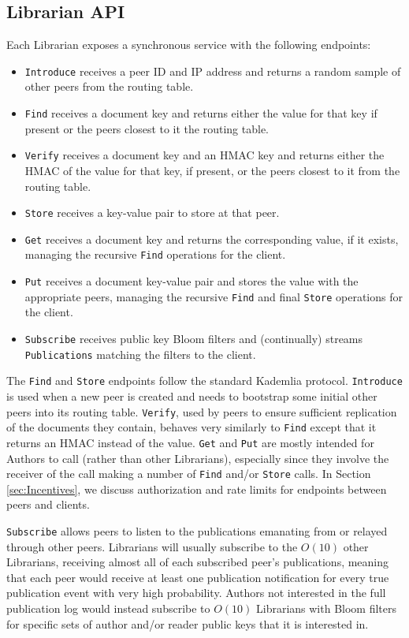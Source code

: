 \documentclass[10pt]{article}
\newcommand{\ttt}[1]{\texttt{#1}}
\def\Put{\ttt{Put}}
\def\Get{\ttt{Get}}
\begin{document}
\subsection{Librarian API}
\label{sec:API}
Each Librarian exposes a synchronous service with the following endpoints:
\begin{itemize}
	\item \ttt{Introduce} receives a peer ID and IP address and returns a random sample of other peers from the routing table.
	\item \ttt{Find} receives a document key and returns either the value for that key if present or the peers closest to it the routing table.
	\item \ttt{Verify} receives a document key and an HMAC key and returns either the HMAC of the value for that key, if present, or the peers closest to it from the routing table.
	\item \ttt{Store} receives a key-value pair to store at that peer.
	\item \ttt{Get} receives a document key and returns the corresponding value, if it exists, managing the recursive \texttt{Find} operations for the client.
	\item \ttt{Put} receives a document key-value pair and stores the value with the appropriate peers, managing the recursive \texttt{Find} and final \ttt{Store} operations for the client.
	\item \ttt{Subscribe} receives public key Bloom filters and (continually) streams \ttt{Publications} matching the filters to the client.
\end{itemize}

The \ttt{Find} and \texttt{Store} endpoints follow the standard Kademlia protocol. \texttt{Introduce} is used when a new peer is created and needs to bootstrap some initial other peers into its routing table. \texttt{Verify}, used by peers to ensure sufficient replication of the documents they contain, behaves very similarly to \texttt{Find} except that it returns an HMAC instead of the value. \Get{} and \Put{} are mostly intended for Authors to call (rather than other Librarians), especially since they involve the receiver of the call making a number of \texttt{Find} and/or \texttt{Store} calls. In Section \ref{sec:Incentives}, we discuss authorization and rate limits for endpoints between peers and clients.

\ttt{Subscribe} allows peers to listen to the publications emanating from or relayed through other peers. Librarians will usually subscribe to the $O(10)$ other Librarians, receiving almost all of each subscribed peer's publications, meaning that each peer would receive at least one publication notification for every true publication event with very high probability. Authors not interested in the full publication log would instead subscribe to $O(10)$ Librarians with Bloom filters for specific sets of author and/or reader public keys that it is interested in.
\end{document}
